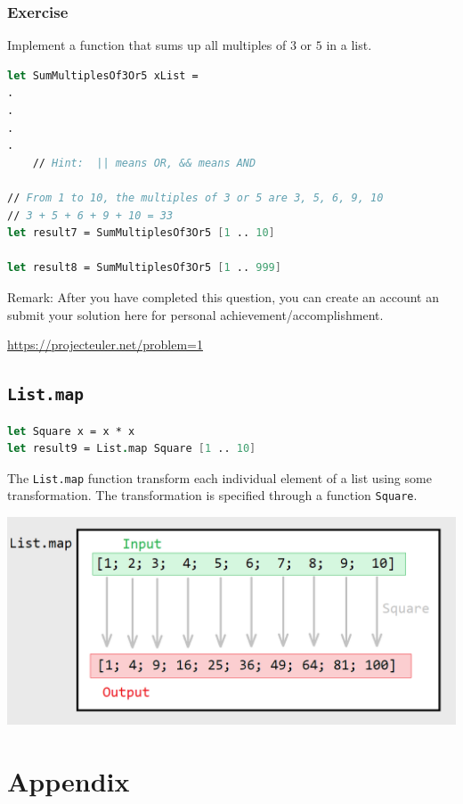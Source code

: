\documentclass[12pt]{article}
\begin{document}
\subsubsection*{Exercise}
Implement a function that sums up all multiples of $3$ or $5$ in a list.

\begin{lstlisting}[language=FSharp]
let SumMultiplesOf3Or5 xList =
.
.
.
.
    // Hint:  || means OR, && means AND

// From 1 to 10, the multiples of 3 or 5 are 3, 5, 6, 9, 10
// 3 + 5 + 6 + 9 + 10 = 33
let result7 = SumMultiplesOf3Or5 [1 .. 10]

let result8 = SumMultiplesOf3Or5 [1 .. 999]
\end{lstlisting}

Remark: After you have completed this question, you can create an account an submit your solution here for personal achievement/accomplishment.

\url{https://projecteuler.net/problem=1}

\pagebreak

\subsection{\texttt{List.map}}

\begin{lstlisting}[language=FSharp]
let Square x = x * x
let result9 = List.map Square [1 .. 10]
\end{lstlisting}
The \texttt{List.map} function transform each individual element of a list using some transformation. The transformation is specified through a function \texttt{Square}.
\begin{center}
\includegraphics[width=14cm]{pictures/picture28.png}
\end{center}   


\pagebreak

\appendix
\section{Appendix}
\end{document}
